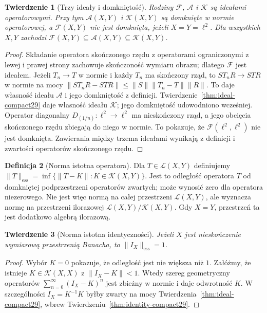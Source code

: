 \documentclass[11pt,a4paper]{article}
\numberwithin{equation}{section}
\theoremstyle{plain}
\newtheorem{twierdzenie}{Twierdzenie}[section]
\theoremstyle{definition}
\newtheorem{definicja}[twierdzenie]{Definicja}
\theoremstyle{remark}
\begin{document}
\begin{twierdzenie}[Trzy ideały i domkniętość]
\label{thm:ideals29}
Rodziny $\mathcal F$, $\mathcal A$ i $\mathcal K$ są
ideałami operatorowymi. Przy tym $\mathcal A(X,Y)$
i $\mathcal K(X,Y)$ są domknięte w normie operatorowej,
a $\mathcal F(X,Y)$ nie jest domknięta, jeżeli
$X=Y=\ell^2$. Dla wszystkich $X,Y$ zachodzi
$\mathcal F(X,Y)\subseteq\mathcal A(X,Y)\subseteq
\mathcal K(X,Y)$.
\end{twierdzenie}
\begin{proof}
Składanie operatora skończonego rzędu z operatorami
ograniczonymi z lewej i prawej strony zachowuje
skończoność wymiaru obrazu; dlatego $\mathcal F$ jest ideałem.
Jeżeli $T_n\to T$ w normie i każdy $T_n$ ma skończony
rząd, to $ST_nR\to STR$ w normie na mocy
$\|ST_nR-STR\|\le\|S\|\|T_n-T\|\|R\|$.
To daje własność ideału $\mathcal A$ i jego domkniętość
z definicji. Twierdzenie~\ref{thm:ideal-compact29}
daje własność ideału $\mathcal K$; jego domkniętość
udowodniono wcześniej. Operator diagonalny
$D_{(1/n)}:\ell^2\to\ell^2$ ma nieskończony rząd,
a jego obcięcia skończonego rzędu zbiegają do niego
w normie. To pokazuje, że $\mathcal F(\ell^2,\ell^2)$
nie jest domknięta. Zawierania między trzema ideałami
wynikają z definicji i zwartości operatorów
skończonego rzędu.
\end{proof}

\begin{definicja}[Norma istotna operatora]
\label{def:essential-norm29}
Dla $T\in\mathcal L(X,Y)$ definiujemy
$\|T\|_{\mathrm{ess}}=
\inf\{\|T-K\|:K\in\mathcal K(X,Y)\}$.
Jest to odległość operatora $T$ od domkniętej
podprzestrzeni operatorów zwartych; może wynosić zero
dla operatora niezerowego. Nie jest więc normą
na całej przestrzeni $\mathcal L(X,Y)$, ale wyznacza normę
na przestrzeni ilorazowej
$\mathcal L(X,Y)/\mathcal K(X,Y)$. Gdy $X=Y$,
przestrzeń ta jest dodatkowo algebrą ilorazową.
\end{definicja}

\begin{twierdzenie}[Norma istotna identyczności]
\label{thm:essential-identity29}
Jeżeli $X$ jest nieskończenie wymiarową przestrzenią
Banacha, to $\|I_X\|_{\mathrm{ess}}=1$.
\end{twierdzenie}
\begin{proof}
Wybór $K=0$ pokazuje, że odległość jest nie większa
niż $1$. Załóżmy, że istnieje $K\in\mathcal K(X,X)$
z $\|I_X-K\|<1$. Wtedy szereg geometryczny operatorów
$\sum_{n=0}^{\infty}(I_X-K)^n$ jest zbieżny w normie
i daje odwrotność $K$. W szczególności
$I_X=K^{-1}K$ byłby zwarty na mocy
Twierdzenia~\ref{thm:ideal-compact29}, wbrew
Twierdzeniu~\ref{thm:identity-compact29}.
\end{proof}
\end{document}
